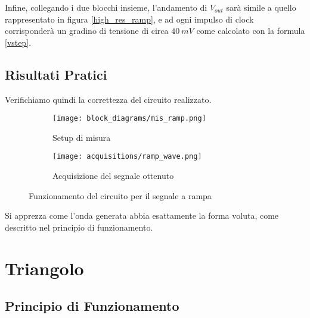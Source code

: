Infine, collegando i due blocchi insieme, l'andamento di $V_{out}$ sarà simile a quello
rappresentato in figura \ref{high_res_ramp}, e ad ogni impulso di clock corrisponderà un
gradino di tensione di circa $40\ mV$ come calcolato con la formula \ref{vstep}.


\subsection*{Risultati Pratici}


Verifichiamo quindi la correttezza del circuito realizzato.

\begin{figure}[H]
    \centering

    \begin{subfigure}{.5\textwidth}
        \centering
        \texttt{[image: block\_diagrams/mis\_ramp.png]}
        \caption{Setup di misura}
        \label{mis_ramp}
    \end{subfigure}%
    \begin{subfigure}{.5\textwidth}
        \centering
        \texttt{[image: acquisitions/ramp\_wave.png]}
        \caption{Acquisizione del segnale ottenuto}
        \label{acq_ramp}
    \end{subfigure}

    \caption{Funzionamento del circuito per il segnale a rampa}
    \label{acq_ramp_signals}
\end{figure}

Si apprezza come l'onda generata abbia esattamente la forma voluta, come descritto nel
principio di funzionamento.


\section{Triangolo}


\subsection*{Principio di Funzionamento}

